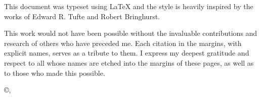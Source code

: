 \cleardoublepage
\thispagestyle{empty}
\hfill
\vfill
\noindent This document was typeset using \LaTeX{} and the style is heavily inspired by the works of Edward R. Tufte and Robert Bringhurst.
    \par
This work would not have been possible without the invaluable contributions and research of others who have preceded me. Each citation in the margins, with explicit names, serves as a tribute to them. I express my deepest gratitude and respect to all whose names are etched into the margins of these pages, as well as to those who made this possible.

    
    \vspace{3em}
    \noindent\textit{\MyTitle}
    
    \noindent\copyright \MyDate, \MyAuthor
\cleardoublepage